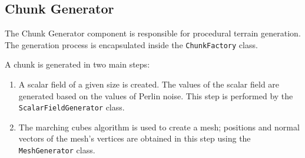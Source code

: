 \subsection{Chunk Generator} \label{chunk_generator}
The Chunk Generator component is responsible for procedural terrain generation.
The generation process is encapsulated inside the \texttt{ChunkFactory} class.

A chunk is generated in two main steps:
\begin{enumerate}
      \item A scalar field of a given size is created.
            The values of the scalar field are generated based on the values of Perlin noise.
            This step is performed by the \texttt{ScalarFieldGenerator} class.
      \item The marching cubes algorithm is used to create a mesh;
            positions and normal vectors of the mesh's vertices are obtained in this step using the \texttt{MeshGenerator} class.
\end{enumerate}